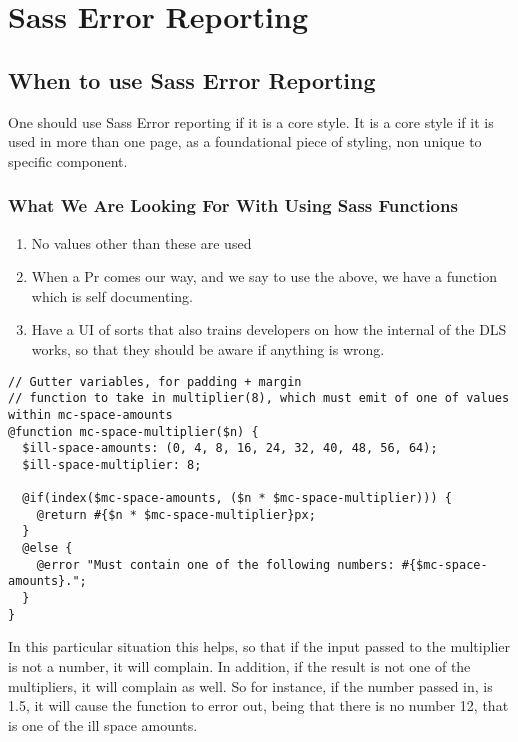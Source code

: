 \maketitle{}
\section{ Sass Error Reporting }

\subsection{ When to use Sass Error Reporting }
One should use Sass Error reporting if it is a core style. It is a core style if
it is used in more than one page, as a foundational piece of styling, non
unique to specific component.

\subsubsection{ What We Are Looking For With Using Sass Functions }
\begin{enumerate}
  \item No values other than these are used
  \item When a Pr comes our way, and we say to use the above, we have a function which is self documenting.
  \item Have a UI of sorts that also trains developers on how the internal of
  the DLS works, so that they should be aware if anything is wrong.
\end{enumerate}

\begin{lstlisting}
// Gutter variables, for padding + margin
// function to take in multiplier(8), which must emit of one of values within mc-space-amounts
@function mc-space-multiplier($n) {
  $ill-space-amounts: (0, 4, 8, 16, 24, 32, 40, 48, 56, 64);
  $ill-space-multiplier: 8;

  @if(index($mc-space-amounts, ($n * $mc-space-multiplier))) {
    @return #{$n * $mc-space-multiplier}px;
  }
  @else {
    @error "Must contain one of the following numbers: #{$mc-space-amounts}.";
  }
}
\end{lstlisting}

In this particular situation this helps, so that if the input passed to the
multiplier is not a number, it will complain. In addition, if the result is not
one of the multipliers, it will complain as well. So for instance, if the number
passed in, is 1.5, it will cause the function to error out, being that there is
no number 12, that is one of the ill space amounts.
